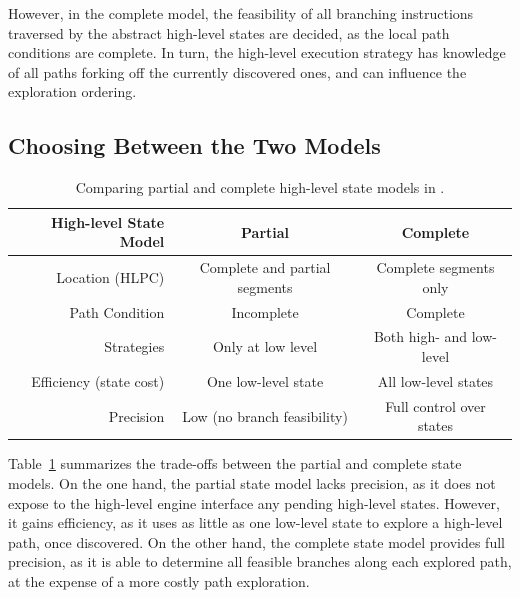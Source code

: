 However, in the complete model, the feasibility of all branching instructions traversed by the abstract high-level states are decided, as the local path conditions are complete.
%
In turn, the high-level execution strategy has knowledge of all paths forking off the currently discovered ones, and can influence the exploration ordering.

\subsection{Choosing Between the Two Models}

\newcommand{\goodcolor}{\cellcolor{LimeGreen}}
\newcommand{\badcolor}{\cellcolor{Lavender}}

\begin{table}
  \centering
  \small
  \begin{tabular}{r c c}
    High-level State Model & \textbf{Partial} & \textbf{Complete}               \\
    \hline
    \noalign{\smallskip}
    Location (HLPC) & Complete and partial segments & Complete segments only    \\
    Path Condition  & Incomplete                    & Complete                  \\
    Strategies      & Only at low level             & Both high- and low-level  \\
    \noalign{\smallskip}
    \hline
    \noalign{\smallskip}
    Efficiency (state cost) & \goodcolor One low-level state   & \badcolor All low-level states      \\
    Precision       & \badcolor Low (no branch feasibility)   & \goodcolor Full control over states  \\
  \end{tabular}
  \caption{Comparing partial and complete high-level state models in \chef.}
  \label{tab:chef:hl-states}
\end{table}

Table~\ref{tab:chef:hl-states} summarizes the trade-offs between the partial and complete state models.
%
On the one hand, the partial state model lacks precision, as it does not expose to the high-level engine interface any pending high-level states.  However, it gains efficiency, as it uses as little as one low-level state to explore a high-level path, once discovered.
%
On the other hand, the complete state model provides full precision, as it is able to determine all feasible branches along each explored path, at the expense of a more costly path exploration.

